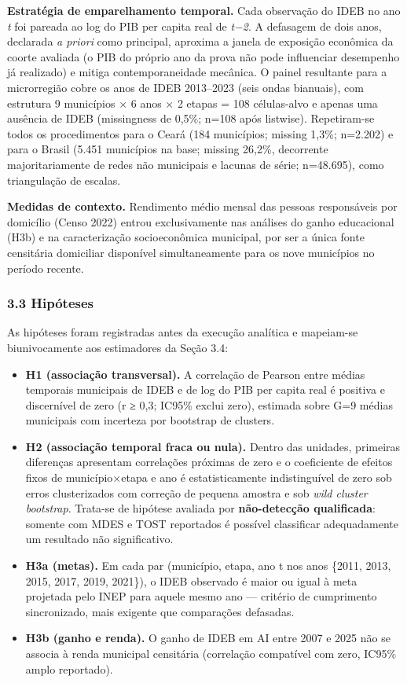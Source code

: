 \documentclass[
  brazilian,
  12pt,
  a4paper,
]{article}
\begin{document}
\textbf{Estratégia de emparelhamento temporal.} Cada observação do IDEB
no ano \emph{t} foi pareada ao log do PIB per capita real de \emph{t−2}.
A defasagem de dois anos, declarada \emph{a priori} como principal,
aproxima a janela de exposição econômica da coorte avaliada (o PIB do
próprio ano da prova não pode influenciar desempenho já realizado) e
mitiga contemporaneidade mecânica. O painel resultante para a
microrregião cobre os anos de IDEB 2013--2023 (seis ondas bianuais), com
estrutura 9 municípios × 6 anos × 2 etapas = 108 células-alvo e apenas
uma ausência de IDEB (missingness de 0,5\%; n=108 após listwise).
Repetiram-se todos os procedimentos para o Ceará (184 municípios;
missing 1,3\%; n=2.202) e para o Brasil (5.451 municípios na base;
missing 26,2\%, decorrente majoritariamente de redes não municipais e
lacunas de série; n=48.695), como triangulação de escalas.

\textbf{Medidas de contexto.} Rendimento médio mensal das pessoas
responsáveis por domicílio (Censo 2022) entrou exclusivamente nas
análises do ganho educacional (H3b) e na caracterização socioeconômica
municipal, por ser a única fonte censitária domiciliar disponível
simultaneamente para os nove municípios no período recente.

\subsubsection{3.3 Hipóteses}\label{hipuxf3teses}

As hipóteses foram registradas antes da execução analítica e mapeiam-se
biunivocamente aos estimadores da Seção 3.4:

\begin{itemize}
\item
  \textbf{H1 (associação transversal).} A correlação de Pearson entre
  médias temporais municipais de IDEB e de log do PIB per capita real é
  positiva e discernível de zero (r ≥ 0,3; IC95\% exclui zero), estimada
  sobre G=9 médias municipais com incerteza por bootstrap de clusters.
\item
  \textbf{H2 (associação temporal fraca ou nula).} Dentro das unidades,
  primeiras diferenças apresentam correlações próximas de zero e o
  coeficiente de efeitos fixos de município×etapa e ano é
  estatisticamente indistinguível de zero sob erros clusterizados com
  correção de pequena amostra e sob \emph{wild cluster bootstrap}.
  Trata-se de hipótese avaliada por \textbf{não-detecção qualificada}:
  somente com MDES e TOST reportados é possível classificar
  adequadamente um resultado não significativo.
\item
  \textbf{H3a (metas).} Em cada par (município, etapa, ano t nos anos
  \{2011, 2013, 2015, 2017, 2019, 2021\}), o IDEB observado é maior ou
  igual à meta projetada pelo INEP para aquele mesmo ano --- critério de
  cumprimento sincronizado, mais exigente que comparações defasadas.
\item
  \textbf{H3b (ganho e renda).} O ganho de IDEB em AI entre 2007 e 2025
  não se associa à renda municipal censitária (correlação compatível com
  zero, IC95\% amplo reportado).
\end{itemize}
\end{document}
